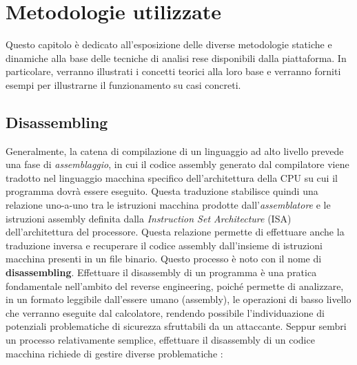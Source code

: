 \documentclass[../main.tex]{subfiles}
\begin{document}
\chapter{Metodologie utilizzate}
\label{chap:oth}
Questo capitolo è dedicato all'esposizione delle diverse metodologie statiche e dinamiche alla base delle tecniche di analisi rese disponibili dalla piattaforma.
In particolare, verranno illustrati i concetti teorici alla loro base e verranno forniti esempi per illustrarne il funzionamento su casi concreti.
\section{Disassembling}
Generalmente, la catena di compilazione di un linguaggio ad alto livello prevede una fase di \textit{assemblaggio}, in cui il codice assembly generato dal compilatore viene tradotto
nel linguaggio macchina specifico dell'architettura della CPU su cui il programma dovrà essere eseguito. Questa traduzione stabilisce quindi una relazione uno-a-uno tra le istruzioni macchina
prodotte dall'\textit{assemblatore} e le istruzioni assembly definita dalla \textit{Instruction Set Architecture} (ISA) dell'architettura del processore.
Questa relazione permette di effettuare anche la traduzione inversa e recuperare il codice assembly dall'insieme di istruzioni macchina presenti in un file binario.
Questo processo è noto con il nome di \textbf{disassembling}. Effettuare il disassembly di un programma è una pratica fondamentale nell'ambito del reverse engineering, poiché permette di analizzare, in un formato leggibile dall'essere umano (assembly), le operazioni
di basso livello che verranno eseguite dal calcolatore, rendendo possibile l'individuazione di potenziali problematiche di sicurezza sfruttabili da un attaccante.
Seppur sembri un processo relativamente semplice, effettuare il disassembly di un codice macchina richiede di gestire diverse problematiche \cite{Disassembly2}:
\end{document}
